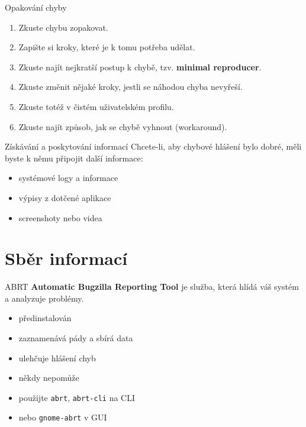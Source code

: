 \documentclass[12pt,aspectratio=169]{beamer}
\begin{document}
\begin{frame}{Opakování chyby}
	\begin{enumerate}
		\item Zkuste chybu zopakovat.
		\item Zapište si kroky, které je k tomu potřeba udělat.
		\item Zkuste najít nejkratší postup k chybě, tzv. \textbf{minimal reproducer}.
		\item Zkuste změnit nějaké kroky, jestli se náhodou chyba nevyřeší.
		\item Zkuste totéž v čistém uživatelském profilu.
		\item Zkuste najít způsob, jak se chybě vyhnout (workaround).
	\end{enumerate}
\end{frame}

\begin{frame}{Získávání a poskytování informací}
Chcete-li, aby chybové hlášení bylo dobré, měli byste k němu připojit další informace:
\begin{itemize}
	\item systémové logy a informace
	\item výpisy z dotčené aplikace
	\item screenshoty nebo videa
\end{itemize}
\end{frame}

\section{Sběr informací}
\begin{frame}{ABRT}
\textbf{Automatic Bugzilla Reporting Tool} je služba, která hlídá váš systém a analyzuje problémy.
\begin{itemize}
	\item předinstalován
	\item zaznamenává pády a sbírá data
	\item ulehčuje hlášení chyb
	\item někdy nepomůže
	\item použijte {\color{blue}\texttt{abrt}}, {\color{blue} \texttt{abrt-cli}} na CLI
	\item nebo {\color{blue} \texttt{gnome-abrt}} v GUI 
\end{itemize}
\end{frame}
\end{document}
